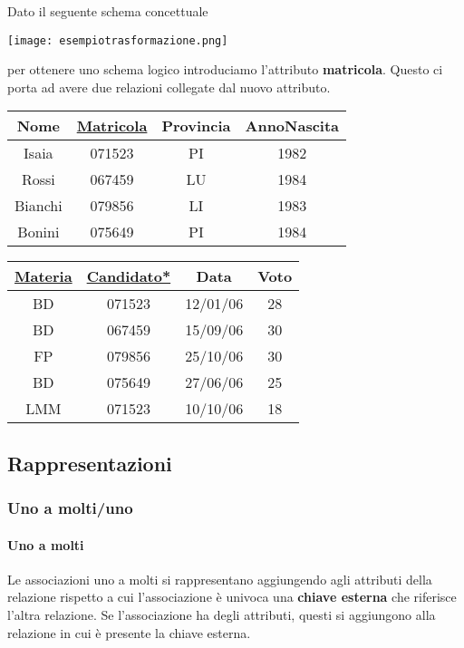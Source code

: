 \begin{example}
	Dato il seguente schema concettuale
	\begin{center}
		\texttt{[image: esempiotrasformazione.png]}
	\end{center}
	per ottenere uno schema logico introduciamo l'attributo \textbf{matricola}. Questo ci porta ad avere due relazioni collegate dal nuovo attributo.
	\begin{center}
		\begin{tabular}{|c|c|c|c|}
			\hline
			\textbf{Nome} & \textbf{\underline{Matricola}} & \textbf{Provincia} & \textbf{AnnoNascita} \\
			\hline
			Isaia & 071523 & PI & 1982 \\
			\hline
			Rossi & 067459 & LU & 1984 \\
			\hline
			Bianchi & 079856 & LI & 1983 \\
			\hline
			Bonini & 075649 & PI & 1984 \\
			\hline
		\end{tabular}
	\end{center}
	\begin{center}		
		\begin{tabular}{|c|c|c|c|}
			\hline
			\textbf{\underline{Materia}} & \textbf{\underline{Candidato*}} & \textbf{Data} & \textbf{Voto} \\
			\hline
			BD & 071523 & 12/01/06 & 28 \\
			\hline
			BD & 067459 & 15/09/06 & 30\\
			\hline
			FP & 079856 & 25/10/06 & 30 \\
			\hline
			BD & 075649 & 27/06/06 & 25 \\
			\hline
			LMM & 071523 & 10/10/06 & 18 \\
			\hline
		\end{tabular}
	\end{center}
\end{example}
\newpage
\subsection{Rappresentazioni}
\subsubsection{Uno a molti/uno}
\paragraph{Uno a molti}
Le associazioni uno a molti si rappresentano aggiungendo agli attributi della relazione rispetto a cui l’associazione è univoca una \textbf{chiave esterna} che riferisce l’altra relazione. Se l’associazione ha degli attributi, questi si aggiungono alla relazione in cui è presente la chiave esterna.

